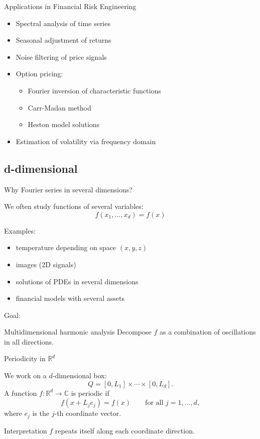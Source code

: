 \documentclass[aspectratio=169]{beamer}
\begin{document}
\begin{frame}{Applications in Financial Risk Engineering}

\begin{itemize}
    \item Spectral analysis of time series
    \item Seasonal adjustment of returns
    \item Noise filtering of price signals
    \item Option pricing:
    \begin{itemize}
        \item Fourier inversion of characteristic functions
        \item Carr-Madan method
        \item Heston model solutions
    \end{itemize}
    \item Estimation of volatility via frequency domain
\end{itemize}

\end{frame}


\subsection{d-dimensional}

\begin{frame}{Why Fourier series in several dimensions?}

We often study functions of several variables:
\[
f(x_1,\dots,x_d)=f(x)
\]

Examples:
\begin{itemize}
    \item temperature depending on space $(x,y,z)$
    \item images (2D signals)
    \item solutions of PDEs in several dimensions
    \item financial models with several assets
\end{itemize}
\pause
Goal:
\begin{block}{Multidimensional harmonic analysis}
Decompose $f$ as a combination of oscillations in all directions.
\end{block}

\end{frame}

\begin{frame}{Periodicity in $\mathbb{R}^d$}

We work on a $d$-dimensional box:
\[
Q = [0,L_1]\times \cdots \times [0,L_d].
\]
\pause
A function $f:\mathbb{R}^d\to\mathbb{C}$ is periodic if
\[
f(x+L_j e_j)=f(x)\qquad \text{for all } j=1,\dots,d,
\]
where $e_j$ is the $j$-th coordinate vector.
\pause
\begin{block}{Interpretation}
$f$ repeats itself along each coordinate direction.
\end{block}

\end{frame}
\end{document}
